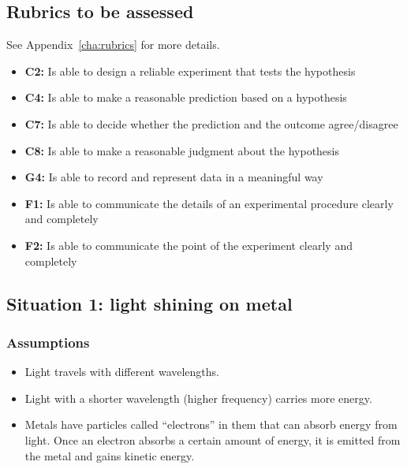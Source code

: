 \subsection{Rubrics to be assessed}

See Appendix~\ref{cha:rubrics} for more details.

\begin{itemize}
	\item \textbf{C2:} Is able to design a reliable experiment that tests the hypothesis
	
	\item \textbf{C4:} Is able to make a reasonable prediction based on a hypothesis
	
	\item \textbf{C7:} Is able to decide whether the prediction and the outcome agree/disagree
	
	\item \textbf{C8:} Is able to make a reasonable judgment about the hypothesis
	
	\item \textbf{G4:} Is able to record and represent data in a meaningful way
	
	\item \textbf{F1:} Is able to communicate the details of an experimental procedure clearly and completely
	
	\item \textbf{F2:} Is able to communicate the point of the experiment clearly and completely
\end{itemize}

\subsection{Situation 1: light shining on metal}

\subsubsection{Assumptions}

\begin{itemize}
	\item Light travels with different wavelengths.
	
	\item Light with a shorter wavelength (higher frequency) carries more energy.
	
	\item Metals have particles called ``electrons'' in them that can absorb energy from light. Once an electron absorbs a certain amount of energy, it is emitted from the metal and gains kinetic energy.
\end{itemize}


